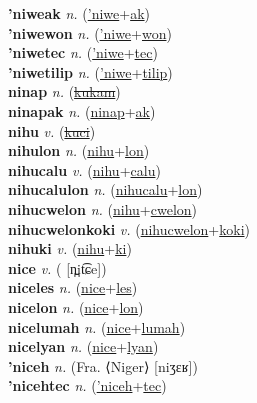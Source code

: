 \textbf{'niweak} \textit{n.} (\hyperref['niwe]{'niwe}+\hyperref[ak]{ak})
 \label{'niweak} \\
\textbf{'niwewon} \textit{n.} (\hyperref['niwe]{'niwe}+\hyperref[won]{won})
 \label{'niwewon} \\
\textbf{'niwetec} \textit{n.} (\hyperref['niwe]{'niwe}+\hyperref[tec]{tec})
 \label{'niwetec} \\
\textbf{'niwetilip} \textit{n.} (\hyperref['niwe]{'niwe}+\hyperref[tilip]{tilip})
 \label{'niwetilip} \\
\textbf{ninap} \textit{n.} (\hyperref[kukam]{\sout{kukam}})
 \label{ninap} \\
\textbf{ninapak} \textit{n.} (\hyperref[ninap]{ninap}+\hyperref[ak]{ak})
 \label{ninapak} \\
\textbf{nihu} \textit{v.} (\hyperref[kuci]{\sout{kuci}})
 \label{nihu} \\
\textbf{nihulon} \textit{n.} (\hyperref[nihu]{nihu}+\hyperref[lon]{lon})
 \label{nihulon} \\
\textbf{nihucalu} \textit{v.} (\hyperref[nihu]{nihu}+\hyperref[calu]{calu})
 \label{nihucalu} \\
\textbf{nihucalulon} \textit{n.} (\hyperref[nihucalu]{nihucalu}+\hyperref[lon]{lon})
 \label{nihucalulon} \\
\textbf{nihucwelon} \textit{n.} (\hyperref[nihu]{nihu}+\hyperref[cwelon]{cwelon})
 \label{nihucwelon} \\
\textbf{nihucwelonkoki} \textit{v.} (\hyperref[nihucwelon]{nihucwelon}+\hyperref[koki]{koki})
 \label{nihucwelonkoki} \\
\textbf{nihuki} \textit{v.} (\hyperref[nihu]{nihu}+\hyperref[ki]{ki})
 \label{nihuki} \\
\textbf{nice} \textit{v.} ( [n̪it͡ɕe])
 \label{nice} \\
\textbf{niceles} \textit{n.} (\hyperref[nice]{nice}+\hyperref[les]{les})
 \label{niceles} \\
\textbf{nicelon} \textit{n.} (\hyperref[nice]{nice}+\hyperref[lon]{lon})
 \label{nicelon} \\
\textbf{nicelumah} \textit{n.} (\hyperref[nice]{nice}+\hyperref[lumah]{lumah})
 \label{nicelumah} \\
\textbf{nicelyan} \textit{n.} (\hyperref[nice]{nice}+\hyperref[lyan]{lyan})
 \label{nicelyan} \\
\textbf{'niceh} \textit{n.} (Fra. ⟨Niger⟩ [niʒɛʁ])
 \label{'niceh} \\
\textbf{'nicehtec} \textit{n.} (\hyperref['niceh]{'niceh}+\hyperref[tec]{tec})

